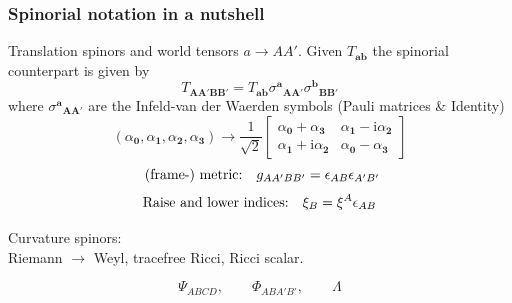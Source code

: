 \documentclass[10pt]{beamer}
\theoremstyle{plain}
\def\bma{{\bm a}}
\def\bmb{{\bm b}}
\def\bmA{{\bm A}}
\def\bmB{{\bm B}}
\begin{document}
\begin{frame}
\frametitle{Spinorial notation in a nutshell}
Translation spinors and world tensors $a\rightarrow AA'$.
Given $T_{\bma\bmb}$ the spinorial counterpart is given by
\begin{equation*}
T_{\bmA\bmA'\bmB\bmB'}=T_{\bma\bmb}\sigma^{\bma}{}_{\bmA\bmA'}\sigma^{\bmb}{}_{\bmB\bmB'}
\end{equation*} 
where $\sigma^{\bma}{}_{\bmA\bmA'}$ are the Infeld-van der Waerden symbols (Pauli matrices \& Identity) 
\begin{equation*}
(\alpha_{\bm0},\alpha_{\bm1},\alpha_{\bm2},\alpha_{\bm3})\rightarrow
\frac{1}{\sqrt{2}}
  \begin{bmatrix}
    \alpha_{\bm0}+ \alpha_{\bm3} & \alpha_{\bm1}-\mbox{i}\alpha_{\bm2} \\
    \alpha_{\bm1}+\mbox{i}\alpha_{\bm2} &  \alpha_{\bm0}-\alpha_{\bm3}
  \end{bmatrix}
\end{equation*}
\pause
\vspace{2mm}
\[
\text{ \textcolor{black}{(frame-) metric:}}\quad g_{AA'BB'}=\epsilon_{AB}\epsilon_{A'B'}
\]
\[
\text{\textcolor{black}{Raise and lower indices:}}\quad \xi_{B}=\xi^A\epsilon_{AB}
\]
\begin{center}
Curvature spinors:\\
Riemann $\rightarrow$ Weyl, \;\;\;tracefree Ricci, \;\;\; Ricci scalar.
\end{center}
\[
\Psi_{ABCD}, \qquad \Phi_{ABA'B'}, \qquad \Lambda
\]
\end{frame}
\end{document}
